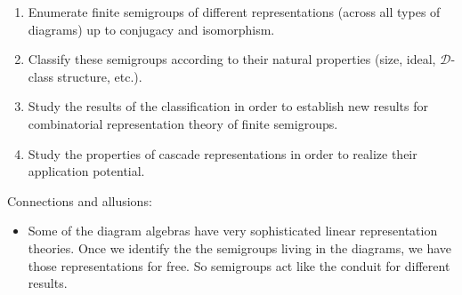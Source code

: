 \documentclass{amsart}
\newcommand{\cD}{\mathcal D}
\begin{document}
\begin{enumerate}
\item Enumerate finite semigroups of different representations (across all types of diagrams) up to conjugacy and isomorphism.
\item Classify these semigroups according to their natural properties (size, ideal, $\cD$-class structure, etc.).
\item Study the results of the classification in order to establish new results for combinatorial representation theory of finite semigroups.
\item Study the properties of cascade representations in order to realize their application potential.
\end{enumerate}

Connections and allusions:
\begin{itemize}
\item Some of the diagram algebras have very sophisticated linear representation theories. Once we identify the the semigroups living in the diagrams, we have those representations for free. So semigroups act like the conduit for different results.
\end{itemize}
\end{document}
